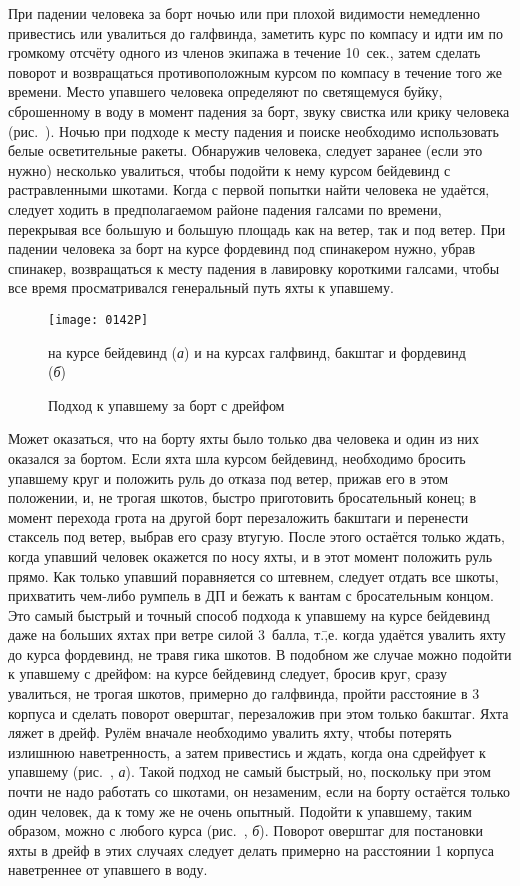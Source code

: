 При падении человека за борт ночью или при плохой видимости немедленно
привестись или увалиться до галфвинда, заметить курс по компасу и идти
им по громкому отсчёту одного из членов экипажа в течение 10~сек., затем сделать поворот и возвращаться противоположным курсом
по компасу в течение того же времени. Место упавшего человека
определяют по светящемуся буйку, сброшенному в воду в момент падения
за борт, звуку свистка или крику человека (рис.~). Ночью при
подходе к месту падения и поиске необходимо использовать белые
осветительные ракеты. Обнаружив человека, следует заранее (если это
нужно) несколько увалиться, чтобы подойти к нему курсом бейдевинд с
растравленными шкотами. Когда с первой попытки найти человека не
удаётся, следует ходить в предполагаемом районе падения галсами по
времени, перекрывая все большую и большую площадь как на ветер, так и
под ветер. При падении человека за борт на курсе фордевинд под
спинакером нужно, убрав спинакер, возвращаться к месту падения в
лавировку короткими галсами, чтобы все время просматривался
генеральный путь яхты к упавшему.

\begin{figure*}[h]
  \centering{}
  \texttt{[image: 0142P]}
  \caption{Подход к упавшему за борт с дрейфом}
  \label{fig:142}
  \small
  \centering{}
  на курсе бейдевинд (\textit{а}) и на курсах галфвинд, бакштаг и фордевинд (\textit{б})
\end{figure*}

Может оказаться, что на борту яхты было только два человека и один из
них оказался за бортом. Если яхта шла курсом бейдевинд, необходимо
бросить упавшему круг и положить руль до отказа под ветер, прижав его
в этом положении, и, не трогая шкотов, быстро приготовить бросательный
конец; в момент перехода грота на другой борт перезаложить бакштаги и
перенести стаксель под ветер, выбрав его сразу втугую. После этого
остаётся только ждать, когда упавший человек окажется по носу яхты, и
в этот момент положить руль прямо. Как только упавший поравняется со
штевнем, следует отдать все шкоты, прихватить чем-либо румпель в ДП и
бежать к вантам с бросательным концом. Это самый быстрый и точный
способ подхода к упавшему на курсе бейдевинд даже на больших яхтах при
ветре силой 3~балла, т.\=,е. когда удаётся увалить яхту до
курса фордевинд, не травя гика шкотов. В подобном же случае можно
подойти к упавшему с дрейфом: на курсе бейдевинд следует, бросив круг,
сразу увалиться, не трогая шкотов, примерно до галфвинда, пройти
расстояние в 3 корпуса и сделать поворот оверштаг, перезаложив
при этом только бакштаг. Яхта ляжет в дрейф. Рулём вначале необходимо
увалить яхту, чтобы потерять излишнюю наветренность, а затем
привестись и ждать, когда она сдрейфует к упавшему (рис.~,
\textit{а}). Такой подход не самый быстрый, но, поскольку при этом
почти не надо работать со шкотами, он незаменим, если на борту
остаётся только один человек, да к тому же не очень опытный. Подойти к
упавшему, таким образом, можно с любого курса (рис.~,
\textit{б}). Поворот оверштаг для постановки яхты в дрейф в этих
случаях следует делать примерно на расстоянии 1 корпуса наветреннее от
упавшего в воду.

